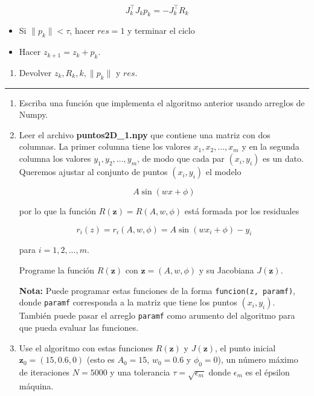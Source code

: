 \documentclass[11pt]{article}
\providecommand{\tightlist}{%
      \setlength{\itemsep}{0pt}\setlength{\parskip}{0pt}}
\begin{document}
\[  J_{k}^\top J_{k} p_k = -J_{k}^\top R_{k} \]

\begin{itemize}
\tightlist
\item
  Si \(\|p_k\|<\tau\), hacer \(res=1\) y terminar el ciclo
\item
  Hacer \(z_{k+1} = z_k + p_k\).
\end{itemize}

\begin{enumerate}
\def\labelenumi{\arabic{enumi}.}
\setcounter{enumi}{2}
\tightlist
\item
  Devolver \(z_k, R_k, k, \|p_k\|\) y \(res\).
\end{enumerate}

\begin{center}\rule{0.5\linewidth}{0.5pt}\end{center}

\begin{enumerate}
\def\labelenumi{\arabic{enumi}.}
\item
  Escriba una función que implementa el algoritmo anterior usando
  arreglos de Numpy.
\item
  Leer el archivo \textbf{puntos2D\_1.npy} que contiene una matriz con
  dos columnas. La primer columna tiene los valores
  \(x_1, x_2, ..., x_m\) y en la segunda columna los valores
  \(y_1, y_2, ..., y_m\), de modo que cada par \((x_i, y_i)\) es un
  dato. Queremos ajustar al conjunto de puntos \((x_i, y_i)\) el modelo

  \[  A \sin(w x + \phi)\]

  por lo que la función \(R(\mathbf{z})=R(A, w, \phi)\) está formada por
  los residuales

  \[ r_i(z) = r_i(A, w, \phi) = A \sin(w x_i + \phi) - y_i \]

  para \(i=1,2,...,m\).

  Programe la función \(R(\mathbf{z})\) con
  \(\mathbf{z} = (A, w, \phi)\) y su Jacobiana \(J(\mathbf{z})\).

  \textbf{Nota:} Puede programar estas funciones de la forma
  \texttt{funcion(z,\ paramf)}, donde \texttt{paramf} corresponda a la
  matriz que tiene los puntos \((x_i,y_i)\). También puede pasar el
  arreglo \texttt{paramf} como arumento del algoritmo para que pueda
  evaluar las funciones.
\item
  Use el algoritmo con estas funciones \(R(\mathbf{z})\) y
  \(J(\mathbf{z})\), el punto inicial \(\mathbf{z}_0 = (15, 0.6, 0)\)
  (esto es \(A_0=15\), \(w_0=0.6\) y \(\phi_0=0\)), un número máximo de
  iteraciones \(N=5000\) y una tolerancia \(\tau =\sqrt{\epsilon_m}\)
  donde \(\epsilon_m\) es el épsilon máquina.
\end{enumerate}
\end{document}
